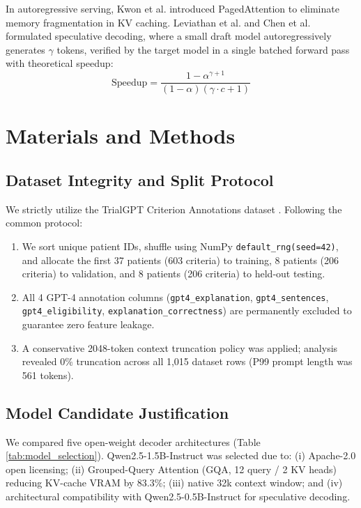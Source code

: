 \documentclass[conference]{IEEEtran}
\begin{document}
In autoregressive serving, Kwon et al. \cite{kwon2023efficient} introduced PagedAttention to eliminate memory fragmentation in KV caching. Leviathan et al. \cite{leviathan2023fast} and Chen et al. \cite{chen2023accelerating} formulated speculative decoding, where a small draft model autoregressively generates $\gamma$ tokens, verified by the target model in a single batched forward pass with theoretical speedup:
\begin{equation}
\text{Speedup} = \frac{1 - \alpha^{\gamma+1}}{(1 - \alpha)(\gamma \cdot c + 1)}
\end{equation}

\section{Materials and Methods}

\subsection{Dataset Integrity and Split Protocol}
We strictly utilize the TrialGPT Criterion Annotations dataset \cite{jin2024matching}. Following the common protocol:
\begin{enumerate}
    \item We sort unique patient IDs, shuffle using NumPy \texttt{default\_rng(seed=42)}, and allocate the first 37 patients (603 criteria) to training, 8 patients (206 criteria) to validation, and 8 patients (206 criteria) to held-out testing.
    \item All 4 GPT-4 annotation columns (\texttt{gpt4\_explanation}, \texttt{gpt4\_sentences}, \texttt{gpt4\_eligibility}, \texttt{explanation\_correctness}) are permanently excluded to guarantee zero feature leakage.
    \item A conservative 2048-token context truncation policy was applied; analysis revealed 0\% truncation across all 1,015 dataset rows (P99 prompt length was 561 tokens).
\end{enumerate}

\subsection{Model Candidate Justification}
We compared five open-weight decoder architectures (Table \ref{tab:model_selection}). Qwen2.5-1.5B-Instruct was selected due to: (i) Apache-2.0 open licensing; (ii) Grouped-Query Attention (GQA, 12 query / 2 KV heads) reducing KV-cache VRAM by 83.3\%; (iii) native 32k context window; and (iv) architectural compatibility with Qwen2.5-0.5B-Instruct for speculative decoding.
\end{document}
